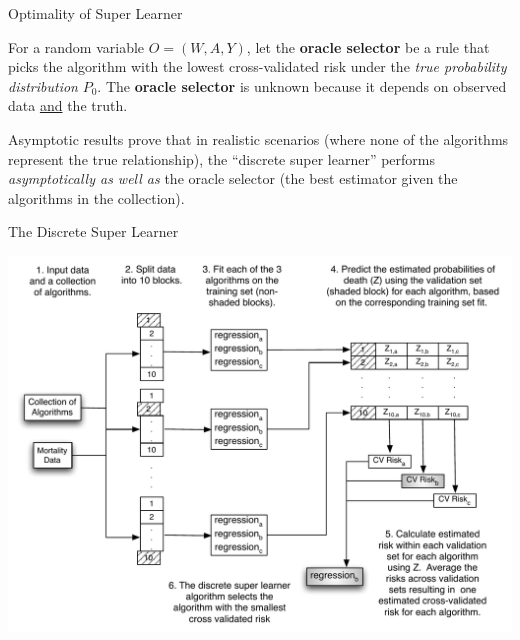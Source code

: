 \documentclass[12pt,t]{beamer}
\begin{document}
\begin{frame}[c]{Optimality of Super Learner}

\vspace*{1mm}

\centering

  For a random variable $O = (W, A, Y)$, let the \textbf{oracle selector} be a
  rule that picks the algorithm with the lowest cross-validated risk under the
  \textit{true probability distribution} $P_{0}$. The \textbf{oracle selector}
  is unknown because it depends on observed data \underline{and} the truth.

\vspace{1em}

  Asymptotic results prove that in realistic scenarios (where none of the
  algorithms represent the true relationship), the ``discrete super learner''
  performs \textit{asymptotically as well as} the oracle selector (the best
  estimator given the algorithms in the collection).

\end{frame}


\begin{frame}[c]{The Discrete Super Learner}

\vspace*{3mm}

\centering

\includegraphics[scale=0.45]{discreteSL.pdf}

\note{
}
\end{frame}
\end{document}
